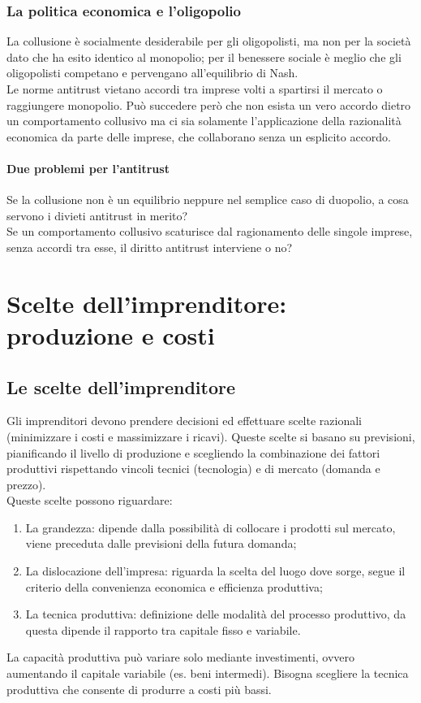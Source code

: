\documentclass{report}
\begin{document}
	\subsection{La politica economica e l'oligopolio}
	La collusione è socialmente desiderabile per gli oligopolisti, ma non per la società dato che ha esito identico al monopolio; per il benessere sociale è meglio che gli oligopolisti competano e pervengano all'equilibrio di Nash.
	\medskip \\Le norme antitrust vietano accordi tra imprese volti a spartirsi il mercato o raggiungere monopolio. Può succedere però che non esista un vero accordo dietro un comportamento collusivo ma ci sia solamente l'applicazione della razionalità economica da parte delle imprese, che collaborano senza un esplicito accordo.
	\subsubsection{Due problemi per l'antitrust}
	Se la collusione non è un equilibrio neppure nel semplice caso di duopolio, a cosa servono i divieti antitrust in merito?
	\medskip \\Se un comportamento collusivo scaturisce dal ragionamento delle singole imprese, senza accordi tra esse, il diritto antitrust interviene o no?
	
	\chapter[Scelte dell'imprenditore]{Scelte dell'imprenditore: produzione e costi}
	\section{Le scelte dell'imprenditore}
	Gli imprenditori devono prendere decisioni ed effettuare scelte razionali (minimizzare i costi e massimizzare i ricavi). Queste scelte si basano su previsioni, pianificando il livello di produzione e scegliendo la combinazione dei fattori produttivi rispettando vincoli tecnici (tecnologia) e di mercato (domanda e prezzo).
	\medskip \\
	Queste scelte possono riguardare:
	\begin{enumerate}
		\item La grandezza: dipende dalla possibilità di collocare i prodotti sul mercato, viene preceduta dalle previsioni della futura domanda;
		\item La dislocazione dell'impresa: riguarda la scelta del luogo dove sorge, segue il criterio della convenienza economica e efficienza produttiva;
		\item La tecnica produttiva: definizione delle modalità del processo produttivo, da questa dipende il rapporto tra capitale fisso e variabile.
	\end{enumerate}
	La capacità produttiva può variare solo mediante investimenti, ovvero aumentando il capitale variabile (es. beni intermedi). Bisogna scegliere la tecnica produttiva che consente di produrre a costi più bassi.
\end{document}
